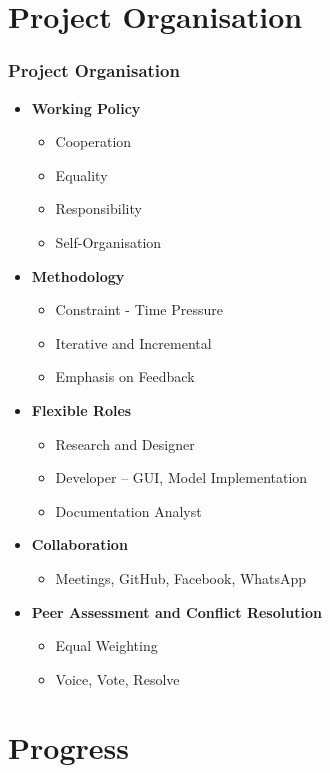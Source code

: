 \documentclass{beamer}
\begin{document}
\section{Project Organisation}

\begin{frame}
\frametitle{Project Organisation}

\begin{itemize}
\item \textbf{Working Policy}
	\begin{itemize}
		\item Cooperation
		\item Equality
		\item Responsibility
		\item Self-Organisation
	\end{itemize}
\item \textbf{Methodology}
	\begin{itemize}
		\item Constraint - Time Pressure
		\item Iterative and Incremental
		\item Emphasis on Feedback
	\end{itemize}
\item \textbf{Flexible Roles}
	\begin{itemize}
		\item Research and Designer
		\item Developer – GUI, Model Implementation
		\item Documentation Analyst
	\end{itemize}
\item \textbf{Collaboration}
	\begin{itemize}
		\item Meetings, GitHub, Facebook, WhatsApp
	\end{itemize}	
\item \textbf{Peer Assessment and Conflict Resolution}
	\begin{itemize}
		\item Equal Weighting
		\item Voice, Vote, Resolve
	\end{itemize}	
\end{itemize}

\end{frame}

\section{Progress}
\end{document}
